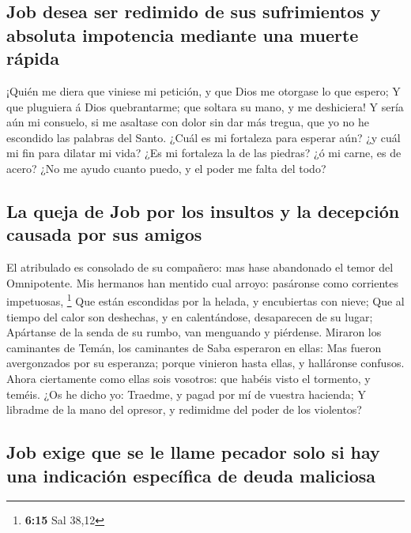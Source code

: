 \hypertarget{job-desea-ser-redimido-de-sus-sufrimientos-y-absoluta-impotencia-mediante-una-muerte-ruxe1pida}{%
\subsection{Job desea ser redimido de sus sufrimientos y absoluta
impotencia mediante una muerte
rápida}\label{job-desea-ser-redimido-de-sus-sufrimientos-y-absoluta-impotencia-mediante-una-muerte-ruxe1pida}}

 ¡Quién me diera que viniese mi petición, y que Dios me
otorgase lo que espero;  Y que pluguiera á Dios
quebrantarme; que soltara su mano, y me deshiciera!  Y
sería aún mi consuelo, si me asaltase con dolor sin dar más tregua, que
yo no he escondido las palabras del Santo.  ¿Cuál es mi
fortaleza para esperar aún? ¿y cuál mi fin para dilatar mi vida?
 ¿Es mi fortaleza la de las piedras? ¿ó mi carne, es de
acero?  ¿No me ayudo cuanto puedo, y el poder me falta del
todo?

\hypertarget{la-queja-de-job-por-los-insultos-y-la-decepciuxf3n-causada-por-sus-amigos}{%
\subsection{La queja de Job por los insultos y la decepción causada por
sus
amigos}\label{la-queja-de-job-por-los-insultos-y-la-decepciuxf3n-causada-por-sus-amigos}}

 El atribulado es consolado de su compañero: mas hase
abandonado el temor del Omnipotente.  Mis hermanos han
mentido cual arroyo: pasáronse como corrientes impetuosas, \footnote{\textbf{6:15}
  Sal 38,12}  Que están escondidas por la helada, y
encubiertas con nieve;  Que al tiempo del calor son
deshechas, y en calentándose, desaparecen de su lugar; 
Apártanse de la senda de su rumbo, van menguando y piérdense.
 Miraron los caminantes de Temán, los caminantes de Saba
esperaron en ellas:  Mas fueron avergonzados por su
esperanza; porque vinieron hasta ellas, y halláronse confusos.
 Ahora ciertamente como ellas sois vosotros: que habéis
visto el tormento, y teméis.  ¿Os he dicho yo: Traedme, y
pagad por mí de vuestra hacienda;  Y libradme de la mano
del opresor, y redimidme del poder de los violentos?

\hypertarget{job-exige-que-se-le-llame-pecador-solo-si-hay-una-indicaciuxf3n-especuxedfica-de-deuda-maliciosa}{%
\subsection{Job exige que se le llame pecador solo si hay una indicación
específica de deuda
maliciosa}\label{job-exige-que-se-le-llame-pecador-solo-si-hay-una-indicaciuxf3n-especuxedfica-de-deuda-maliciosa}}

